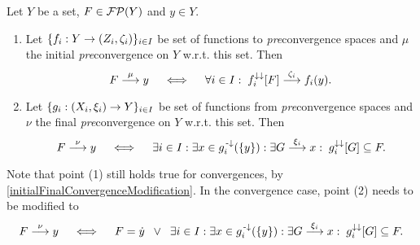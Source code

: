 \begin{proposition} \label{initialFinalConvergence}
Let $Y$ be a set, $F\in \operatorname{\mathcal{FP}}(Y)$ and $y\in Y$.
\begin{enumerate}
\item Let $\{f_i: Y\to \left( Z_i, \zeta_i \right)\}_{i\in I}$ be set of functions to \emph{pre}convergence spaces and $\mu$ the initial \emph{pre}convergence on $Y$ w.r.t. this set. Then
\[ F \overset{\mu}{\longrightarrow} y \quad\iff\quad \forall i\in I: \; f_i^{\downarrow\downarrow}[F] \overset{\zeta_i}{\longrightarrow} f_i(y). \]
\item Let $\{g_i: \left( X_i, \xi_i \right) \to Y\}_{i\in I}$ be set of functions from \emph{pre}convergence spaces and $\nu$ the final \emph{pre}convergence on $Y$ w.r.t. this set. Then
\[ F \overset{\nu}{\longrightarrow} y \quad\iff\quad \exists i\in I: \exists x\in g_i^{\text{\hspace{0.15em}-}\downarrow}(\{y\}):  \exists G \overset{\xi_i}{\longrightarrow} x: \; g_i^{\downarrow\downarrow}[G] \subseteq F. \]
\end{enumerate}
\end{proposition}
Note that point (1) still holds true for convergences, by \ref{initialFinalConvergenceModification}. In the convergence case, point (2) needs to be modified to 
\[ F \overset{\nu}{\longrightarrow} y \quad\iff\quad F = \dot{y} \;\;\lor\;\; \exists i\in I: \exists x\in g_i^{\text{\hspace{0.15em}-}\downarrow}(\{y\}):  \exists G \overset{\xi_i}{\longrightarrow} x: \; g_i^{\downarrow\downarrow}[G] \subseteq F. \]

